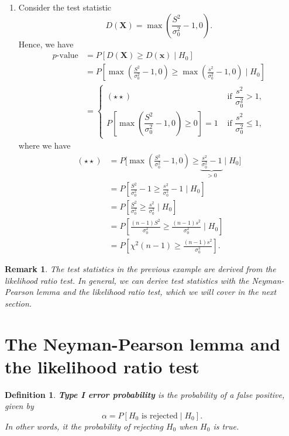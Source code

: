 \documentclass[10pt]{article}
\theoremstyle{newstyle}
\newtheorem{remark}[thm]{Remark}
\newtheorem{defn}[thm]{Definition}
\begin{document}
{\begin{enumerate}[(1)]
    \item Consider the test statistic 
    \[ D(\mathbf X) = \max\left( \frac{S^2}{\sigma_0^2} - 1, 0\right). \]
    Hence, we have 
    \begin{align*}
        \text{$p$-value}
        &= P[D(\mathbf X) \geq D(\mathbf x) \mid H_0] \\
        &= P\left[ \max\left( \frac{S^2}{\sigma_0^2} - 1, 0\right) \geq 
        \max\left( \frac{s^2}{\sigma_0^2} - 1, 0\right) \;\Bigg|\; H_0 \right] \\
        &= \begin{cases} (\star\star) & \text{ if $\dfrac{s^2}{\sigma_0^2} > 1$,} \\[10pt]
        P\left[ \max\left( \dfrac{S^2}{\sigma_0^2} - 1, 0\right) \geq 0 \right] = 1 
        & \text{ if $\dfrac{s^2}{\sigma_0^2} \leq 1$,} \end{cases}
    \end{align*}
    where we have 
    \begin{align*}
        (\star\star) 
        &= P\Bigg[ \max\left( \frac{S^2}{\sigma_0^2} - 1, 0\right) \geq 
        \underbrace{\frac{s^2}{\sigma_0^2} - 1}_{>0} \;\Bigg|\; H_0 \Bigg] \\
        &= P \left[ \frac{S^2}{\sigma_0^2} - 1 \geq \frac{s^2}{\sigma_0^2} - 1 \;\Bigg|\; H_0 \right] \\
        &= P \left[ \frac{S^2}{\sigma_0^2} \geq \frac{s^2}{\sigma_0^2} \;\Bigg|\; H_0 \right] \\
        &= P \left[ \frac{(n-1)S^2}{\sigma_0^2} \geq \frac{(n-1)s^2}{\sigma_0^2} \;\Bigg|\; H_0 \right] \\
        &= P \left[ \chi^2(n-1) \geq \frac{(n-1)s^2}{\sigma_0^2} \right].
    \end{align*}
\end{enumerate}}

\begin{remark}
The test statistics in the previous example are derived from the likelihood ratio test. 
In general, we can derive test statistics with the Neyman-Pearson lemma and the 
likelihood ratio test, which we will cover in the next section. 
\end{remark}

\newpage 
\section{The Neyman-Pearson lemma and the likelihood ratio test}

\begin{defn}
{\bf Type I error probability} is the probability of a false positive, given by 
\[ \alpha = P[H_0 \text{ is rejected} \mid H_0]. \]
In other words, it the probability of rejecting $H_0$ when $H_0$ is true.
\end{defn}
\end{document}
